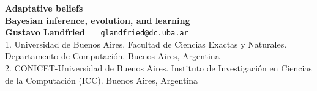 \documentclass[a0,portrait]{a0poster} %
\begin{document}
% 
%  

\centering \fontsize{90}{90} \textbf{Adaptative beliefs} \\[0.4cm]  %
\fontsize{70}{85}\textbf{Bayesian inference, evolution, and learning}\\[1cm] %
\LARGE \textbf{Gustavo Landfried}  \ \ \  \texttt{glandfried@dc.uba.ar} \\
\large 1. Universidad de Buenos Aires. Facultad de Ciencias Exactas y Naturales. Departamento de Computaci\'on. Buenos Aires, Argentina \\ 
\large 2. CONICET-Universidad de Buenos Aires. Instituto de Investigaci\'on en Ciencias de la Computaci\'on (ICC). Buenos Aires, Argentina \\


\vspace{1cm}
\end{document}
